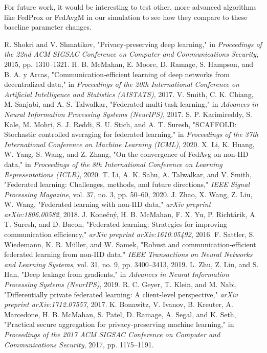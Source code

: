 \documentclass[conference]{IEEEtran}
\begin{document}
For future work, it would be interesting to test other, more advanced algorithms like FedProx \cite{b6} or FedAvgM \cite{b17} in our simulation to see how they compare to these baseline parameter changes.


\begin{thebibliography}{00}
 R. Shokri and V. Shmatikov, "Privacy-preserving deep learning," in \textit{Proceedings of the 22nd ACM SIGSAC Conference on Computer and Communications Security}, 2015, pp. 1310--1321.
 H. B. McMahan, E. Moore, D. Ramage, S. Hampson, and B. A. y Arcas, "Communication-efficient learning of deep networks from decentralized data," in \textit{Proceedings of the 20th International Conference on Artificial Intelligence and Statistics (AISTATS)}, 2017.
 V. Smith, C. K. Chiang, M. Sanjabi, and A. S. Talwalkar, "Federated multi-task learning," in \textit{Advances in Neural Information Processing Systems (NeurIPS)}, 2017.
 S. P. Karimireddy, S. Kale, M. Mohri, S. J. Reddi, S. U. Stich, and A. T. Suresh, "SCAFFOLD: Stochastic controlled averaging for federated learning," in \textit{Proceedings of the 37th International Conference on Machine Learning (ICML)}, 2020.
 X. Li, K. Huang, W. Yang, S. Wang, and Z. Zhang, "On the convergence of FedAvg on non-IID data," in \textit{Proceedings of the 8th International Conference on Learning Representations (ICLR)}, 2020.
 T. Li, A. K. Sahu, A. Talwalkar, and V. Smith, "Federated learning: Challenges, methods, and future directions," \textit{IEEE Signal Processing Magazine}, vol. 37, no. 3, pp. 50--60, 2020.
 J. Zhao, X. Wang, Z. Liu, W. Wang, "Federated learning with non-IID data," \textit{arXiv preprint arXiv:1806.00582}, 2018.
 J. Konečný, H. B. McMahan, F. X. Yu, P. Richtárik, A. T. Suresh, and D. Bacon, "Federated learning: Strategies for improving communication efficiency," \textit{arXiv preprint arXiv:1610.05492}, 2016.
 F. Sattler, S. Wiedemann, K. R. Müller, and W. Samek, "Robust and communication-efficient federated learning from non-IID data," \textit{IEEE Transactions on Neural Networks and Learning Systems}, vol. 31, no. 9, pp. 3400--3413, 2019.
 L. Zhu, Z. Liu, and S. Han, "Deep leakage from gradients," in \textit{Advances in Neural Information Processing Systems (NeurIPS)}, 2019.
 R. C. Geyer, T. Klein, and M. Nabi, "Differentially private federated learning: A client-level perspective," \textit{arXiv preprint arXiv:1712.07557}, 2017.
 K. Bonawitz, V. Ivanov, B. Kreuter, A. Marcedone, H. B. McMahan, S. Patel, D. Ramage, A. Segal, and K. Seth, "Practical secure aggregation for privacy-preserving machine learning," in \textit{Proceedings of the 2017 ACM SIGSAC Conference on Computer and Communications Security}, 2017, pp. 1175--1191.

\end{thebibliography}
\end{document}
